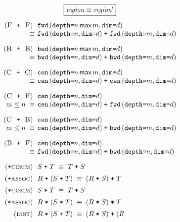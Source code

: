 \documentclass[9pt]{sigplanconf}
\theoremstyle{definition}
\newcommand{\term}[1]{\texttt{#1}}
\newcommand{\stenFwdS}[2]{\term{fwd} \, (\term{depth=}#1,
  \term{dim=}#2)}
\newcommand{\stenBwdS}[2]{\term{bwd} \, (\term{depth=}#1,
  \term{dim=}#2)}
\newcommand{\stenCenS}[2]{\term{cen} \, (\term{depth=}#1,
  \term{dim=}#2)}
\begin{document}
\begin{figure}
\begin{align*}
\setlength{\arraycolsep}{0.05em}
\begin{array}{c}
\framebox{$\textit{region} \equiv \textit{region}'$} \\[1em]
\begin{array}{rll}
(\textsc{F\; \texttt{+} \;F}) \;\; &
\stenFwdS{n \, \textsf{max} \, m}{d} \\
 \equiv \; & \stenFwdS{n}{d} \; \texttt{+} \; \stenFwdS{m}{d} \\[1em]
%
(\textsc{B\; \texttt{+} \;B}) \;\; &
\stenBwdS{n \, \textsf{max} \, m}{d} \\
 \equiv \; & \stenBwdS{n}{d} \; \texttt{+} \; \stenBwdS{m}{d} \\[1em]
%
(\textsc{C\; \texttt{+} \;C}) \;\; &
\stenCenS{n \, \textsf{max} \, m}{d} \\
\equiv \; & \stenCenS{n}{d} \; \texttt{+} \; \stenCenS{m}{d} \\[1em]
%
(\textsc{C\; \texttt{+} \;F}) \;\; & \stenCenS{n}{d} \\
\textit{$m \leq n$} \; \equiv \; & \stenCenS{n}{d} \; \texttt{+} \;
                      \stenFwdS{m}{d} \\[1em]
%
(\textsc{C\; \texttt{+} \;B}) \;\; & 
\stenCenS{n}{d} \\
\textit{$m \leq n$} \; \equiv \; & \stenCenS{n}{d} \; \texttt{+} \;
                      \stenBwdS{m}{d} \\[1em]
(\textsc{B\; \texttt{+} \;F}) \;\; & 
\stenCenS{n}{d} \\
\equiv \; & \stenFwdS{n}{d} \; \texttt{+} \; \stenBwdS{n}{d} \\[1em]
%
(\texttt{+}\textsc{comm}) \;\; & S \; \texttt{+} \; T \; \equiv \; T \;
                       \texttt{+} \; S \\[0.5em]
%
(\texttt{+}\textsc{assoc}) \;\; & R \; \texttt{+} \; (S \; \texttt{+} \; T) \; \equiv \; (R \;
                       \texttt{+} \; S) \; \texttt{+} \; T \\[0.5em]
(\texttt{*}\textsc{comm}) \;\; & S \; \texttt{*} \; T \; \equiv \; T \;
                       \texttt{*} \; S \\[0.5em]
%
(\texttt{*}\textsc{assoc}) \;\; & R \; \texttt{*} \; (S \; \texttt{*} \; T) \; \equiv \; (R \;
                       \texttt{*} \; S) \; \texttt{*} \; T \\[0.5em] 
(\textsc{dist}) \;\; & R \; \texttt{*} \; (S \; \texttt{+} \; T) \; \equiv \; (R \;
                       \texttt{*} \; S) \; \texttt{+} \; (R

\end{array}
\end{array}
\end{align*}
\end{figure}
\end{document}
